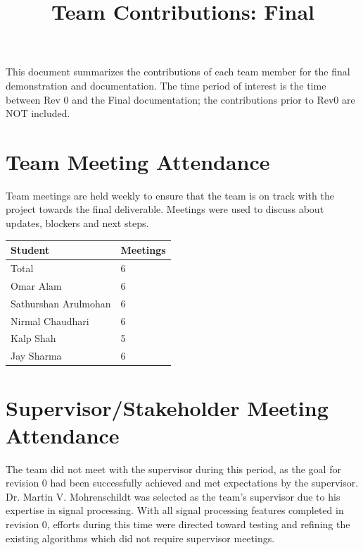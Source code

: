 \documentclass{article}
\title{Team Contributions: Final\\\progname}
\author{\authname}
\date{}
\begin{document}
\maketitle

\newpage

\tableofcontents

\newpage

This document summarizes the contributions of each team member for the final
demonstration and documentation.  The time period of interest is the time
between Rev 0 and the Final documentation; the contributions prior to Rev0 are
NOT included.

\section{Team Meeting Attendance}

Team meetings are held weekly to ensure that the team is on track with the
project towards the final deliverable. Meetings were used to discuss about
updates, blockers and next steps.

\begin{table}[H]
\centering
\begin{tabular}{ll}
\toprule
\textbf{Student} & \textbf{Meetings}\\
\midrule
Total & 6\\
Omar Alam & 6 \\
Sathurshan Arulmohan & 6 \\
Nirmal Chaudhari & 6 \\
Kalp Shah & 5 \\
Jay Sharma & 6 \\
\bottomrule
\end{tabular}
\end{table}

\section{Supervisor/Stakeholder Meeting Attendance}

The team did not meet with the supervisor during this period, as the goal for
revision 0 had been successfully achieved and met expectations by the
supervisor. Dr. Martin V. Mohrenschildt was selected as the team's supervisor
due to his expertise in signal processing. With all signal processing features
completed in revision 0, efforts during this time were directed toward testing
and refining the existing algorithms which did not require supervisor meetings.
\end{document}
